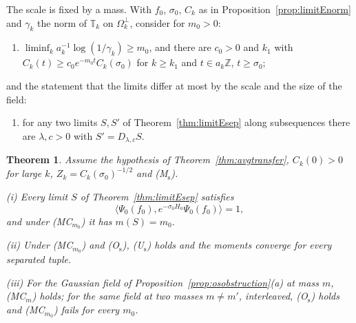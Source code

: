 \documentclass[aps,prd,twocolumn,superscriptaddress,nofootinbib,longbibliography,floatfix,amsmath,amssymb,10pt]{revtex4-2}
\newtheorem{theorem}{Theorem}
\theoremstyle{definition}
\theoremstyle{remark}
\newcommand{\Z}{\mathbb{Z}}
\newcommand{\ip}[2]{\langle #1,#2\rangle}
\begin{document}
The scale is fixed by a mass. With $f_0$, $\sigma_0$, $C_k$ as in
Proposition~\ref{prop:limitEnorm} and $\gamma_k$ the norm of $\mathbb T_k$
on $\Omega_k^\perp$, consider for $m_0>0$:
\begin{enumerate}[label=\textup{(MC$_{m_0}$)},leftmargin=*]
\item $\liminf_k a_k^{-1}\log(1/\gamma_k)\ge m_0$, and there are $c_0>0$
and $k_1$ with $C_k(t)\ge c_0e^{-m_0t}C_k(\sigma_0)$ for $k\ge k_1$ and
$t\in a_k\Z$, $t\ge\sigma_0$;
\end{enumerate}
and the statement that the limits differ at most by the scale and the size
of the field:
\begin{enumerate}[label=\textup{(O$_{\mathrm s}$)},leftmargin=*]
\item for any two limits $S,S'$ of Theorem~\ref{thm:limitEsep} along
subsequences there are $\lambda,c>0$ with $S'=D_{\lambda,c}S$.
\end{enumerate}

\begin{theorem}\label{thm:limitEunique}
Assume the hypothesis of Theorem~\textup{\ref{thm:avgtransfer}},
$C_k(0)>0$ for large $k$, $Z_k=C_k(\sigma_0)^{-1/2}$ and
\textup{(M$_{\mathrm s}$)}.

\textup{(i)} Every limit $S$ of Theorem~\textup{\ref{thm:limitEsep}}
satisfies
\[
\ip{\Psi_0(f_0)}{e^{-\sigma_0H_0}\Psi_0(f_0)}=1,
\]
and under \textup{(MC$_{m_0}$)} it has $m(S)=m_0$.

\textup{(ii)} Under \textup{(MC$_{m_0}$)} and \textup{(O$_{\mathrm s}$)},
\textup{(U$_{\mathrm s}$)} holds and the moments converge for every
separated tuple.

\textup{(iii)} For the Gaussian field of
Proposition~\textup{\ref{prop:osobstruction}(a)} at mass $m$,
\textup{(MC$_m$)} holds; for the same field at two masses $m\ne m'$,
interleaved, \textup{(O$_{\mathrm s}$)} holds and \textup{(MC$_{m_0}$)}
fails for every $m_0$.
\end{theorem}
\end{document}
